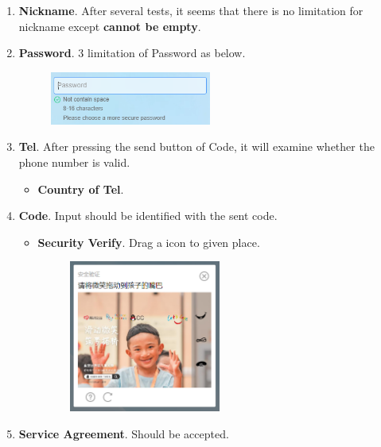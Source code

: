 \documentclass[11pt, oneside]{article}  %
\begin{document}
\begin{enumerate}
    \item \textbf{Nickname}. After several tests, it seems that there is no limitation for nickname except 
        \textbf{cannot be empty}. 
    \item \textbf{Password}. 3 limitation of Password as below.
        \begin{figure}[H]
            \centering
            \includegraphics[width = 0.5\textwidth]{pic/3.1.png}
        \end{figure}
    \item \textbf{Tel}. After pressing the send button of Code, it will examine whether the phone number is valid.
        \begin{itemize}
            \item \textbf{Country of Tel}. 
        \end{itemize}
    \item \textbf{Code}. Input should be identified with the sent code.
        \begin{itemize}
            \item \textbf{Security Verify}. Drag a icon to given place. 
                \begin{figure}[H]
                    \centering
                    \includegraphics[width = 0.5\textwidth]{pic/3.2.png}
                \end{figure}
        \end{itemize}
    \item \textbf{Service Agreement}. Should be accepted. 
\end{enumerate}
\end{document}
